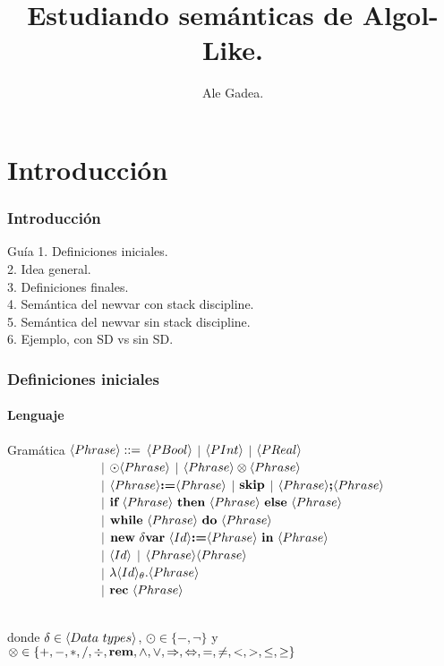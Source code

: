 \documentclass{beamer} %
\begin{document}
\title{Estudiando sem\'anticas de Algol-Like.}
\author{{Ale Gadea.}\\
\vspace*{0.5cm}}
\frame{\titlepage}

\section{Introducci\'on}

\begin{frame}
\frametitle{Introducci\'on}
\begin{block}{Gu\'ia}
1. Definiciones iniciales.\\
2. Idea general.\\
3. Definiciones finales.\\
4. Sem\'antica del newvar con stack discipline.\\
5. Sem\'antica del newvar sin stack discipline.\\
6. Ejemplo, con SD vs sin SD.
\end{block}
\end{frame}

\begin{frame}
\frametitle{Definiciones iniciales}
\framesubtitle{Lenguaje}

\begin{block}{Gram\'atica}
$\langle Phrase \rangle ::=$ $\langle PBool \rangle$ $|$ $\langle PInt \rangle$ $|$ $\langle PReal \rangle$ \\
\ \ \ \ \ \ \ \ \ \ \ \ \ \ \ $|$ 
$\odot \langle Phrase \rangle$ $|$ $\langle Phrase \rangle \otimes \langle Phrase \rangle $ \\ 
\ \ \ \ \ \ \ \ \ \ \ \ \ \ \ $|$ 
$\langle Phrase \rangle \textbf{:=} \langle Phrase \rangle$ $|$ $\textbf{skip}$ $|$ $\langle Phrase \rangle \textbf{;} \langle Phrase \rangle$ \\ 
\ \ \ \ \ \ \ \ \ \ \ \ \ \ \ $|$ 
$\textbf{if} \ \langle Phrase \rangle \ \textbf{then} \ \langle Phrase \rangle \ \textbf{else} \ \langle Phrase \rangle$ \\ 
\ \ \ \ \ \ \ \ \ \ \ \ \ \ \ $|$ 
$\textbf{while} \ \langle Phrase \rangle \ \textbf{do} \ \langle Phrase \rangle$ \\ 
\ \ \ \ \ \ \ \ \ \ \ \ \ \ \ $|$ 
$\textbf{new} \ \delta \textbf{var} \ \langle Id \rangle \textbf{:=} \langle Phrase \rangle \ \textbf{in} \ \langle Phrase \rangle$ \\ 
\ \ \ \ \ \ \ \ \ \ \ \ \ \ \ $|$ 
$\langle Id \rangle$ $|$ $\langle Phrase \rangle\langle Phrase \rangle$ \\
\ \ \ \ \ \ \ \ \ \ \ \ \ \ \ $|$ 
$\lambda \langle Id \rangle_{\theta} . \langle Phrase \rangle $ \\
\ \ \ \ \ \ \ \ \ \ \ \ \ \ \ $|$ 
$\textbf{rec} \ \langle Phrase \rangle$\\
\

donde $\delta \in \lrangles{Data \ types}$, $\odot \in \{-, \neg\}$ y 
$\otimes \in \{+,-,*,/,\div,\textbf{rem},\wedge,\vee,\Rightarrow,\Leftrightarrow, =,\neq,<,>,\leq,\geq\}$\\
\end{block}

\end{frame}
\end{document}
